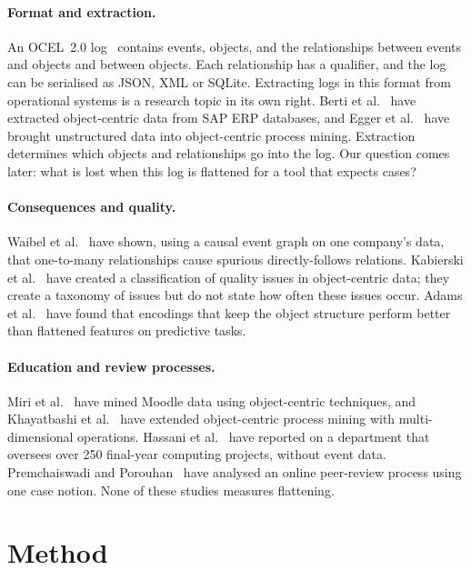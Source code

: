 \documentclass[pdflatex,sn-mathphys-num]{sn-jnl}
\begin{document}
\paragraph{Format and extraction.} An OCEL~2.0 log~\cite{berti2024ocel20} contains events, objects, and the relationships between events and objects and between objects. Each relationship has a qualifier, and the log can be serialised as JSON, XML or SQLite. Extracting logs in this format from operational systems is a research topic in its own right. Berti et al.~\cite{berti2023sap} have extracted object-centric data from SAP ERP databases, and Egger et al.~\cite{egger2025unstructured} have brought unstructured data into object-centric process mining. Extraction determines which objects and relationships go into the log. Our question comes later: what is lost when this log is flattened for a tool that expects cases?

\paragraph{Consequences and quality.} Waibel et al.~\cite{waibel2022causal} have shown, using a causal event graph on one company's data, that one-to-many relationships cause spurious directly-follows relations. Kabierski et al.~\cite{kabierski2026quality} have created a classification of quality issues in object-centric data; they create a taxonomy of issues but do not state how often these issues occur. Adams et al.~\cite{adams2023preserving} have found that encodings that keep the object structure perform better than flattened features on predictive tasks.

\paragraph{Education and review processes.} Miri et al.~\cite{miri2026educational} have mined Moodle data using object-centric techniques, and Khayatbashi et al.~\cite{khayatbashi2026multidim} have extended object-centric process mining with multi-dimensional operations. Hassani et al.~\cite{hassani2018supervision} have reported on a department that oversees over 250 final-year computing projects, without event data. Premchaiswadi and Porouhan~\cite{premchaiswadi2015peer} have analysed an online peer-review process using one case notion. None of these studies measures flattening.

\section{Method}\label{sec:method}
\end{document}
